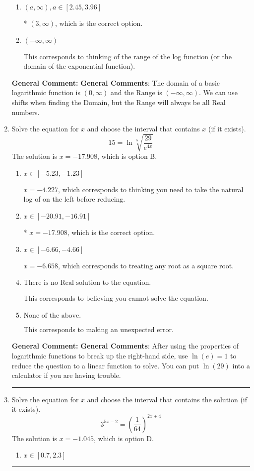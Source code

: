 \documentclass{extbook}[14pt]
\newcommand{\litem}[1]{\item #1

\rule{\textwidth}{0.4pt}}
\begin{document}
\begin{enumerate}
{\begin{enumerate}[label=\Alph*.]
$(-\infty, -3)$, which corresponds to flipping the Domain. Remember: the general for is $a*\log(x-h)+k$, \textbf{where $a$ does not affect the domain}.
\item \( (a, \infty), a \in [2.45, 3.96] \)

* $(3, \infty)$, which is the correct option.
\item \( (-\infty, \infty) \)

This corresponds to thinking of the range of the log function (or the domain of the exponential function).
\end{enumerate}

\textbf{General Comment:} \textbf{General Comments}: The domain of a basic logarithmic function is $(0, \infty)$ and the Range is $(-\infty, \infty)$. We can use shifts when finding the Domain, but the Range will always be all Real numbers.
}
\litem{
 Solve the equation for $x$ and choose the interval that contains $x$ (if it exists).
\[  15 = \ln{\sqrt[5]{\frac{29}{e^{4x}}}} \]The solution is \( x = -17.908 \), which is option B.\begin{enumerate}[label=\Alph*.]
\item \( x \in [-5.23, -1.23] \)

$x = -4.227$, which corresponds to thinking you need to take the natural log of on the left before reducing.
\item \( x \in [-20.91, -16.91] \)

* $x = -17.908$, which is the correct option.
\item \( x \in [-6.66, -4.66] \)

$x = -6.658$, which corresponds to treating any root as a square root.
\item \( \text{There is no Real solution to the equation.} \)

This corresponds to believing you cannot solve the equation.
\item \( \text{None of the above.} \)

This corresponds to making an unexpected error.
\end{enumerate}

\textbf{General Comment:} \textbf{General Comments}: After using the properties of logarithmic functions to break up the right-hand side, use $\ln(e) = 1$ to reduce the question to a linear function to solve. You can put $\ln(29)$ into a calculator if you are having trouble.
}
\litem{
Solve the equation for $x$ and choose the interval that contains the solution (if it exists).
\[ 3^{5x-2} = \left(\frac{1}{64}\right)^{2x+4} \]The solution is \( x = -1.045 \), which is option D.\begin{enumerate}[label=\Alph*.]
\item \( x \in [0.7, 2.3] \)


\end{enumerate}}
\end{enumerate}
\end{document}
